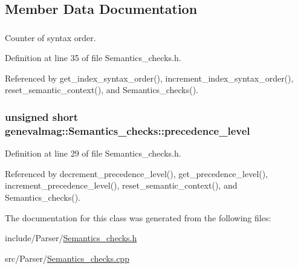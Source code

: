\subsection{Member Data Documentation}
\hypertarget{classgenevalmag_1_1Semantics__checks_7dcdb23df315da76ae288462e3427591}{
\subsubsection[{index\_\-syntax\_\-order}]{}}
\label{classgenevalmag_1_1Semantics__checks_7dcdb23df315da76ae288462e3427591}


Counter of syntax order. 



Definition at line 35 of file Semantics\_\-checks.h.

Referenced by get\_\-index\_\-syntax\_\-order(), increment\_\-index\_\-syntax\_\-order(), reset\_\-semantic\_\-context(), and Semantics\_\-checks().\hypertarget{classgenevalmag_1_1Semantics__checks_e69cd5c1a7b7d2cfa05c370617a8d58f}{
\subsubsection[{precedence\_\-level}]{\setlength{\rightskip}{0pt plus 5cm}unsigned short {\bf genevalmag::Semantics\_\-checks::precedence\_\-level}}}
\label{classgenevalmag_1_1Semantics__checks_e69cd5c1a7b7d2cfa05c370617a8d58f}




Definition at line 29 of file Semantics\_\-checks.h.

Referenced by decrement\_\-precedence\_\-level(), get\_\-precedence\_\-level(), increment\_\-precedence\_\-level(), reset\_\-semantic\_\-context(), and Semantics\_\-checks().

The documentation for this class was generated from the following files:\begin{CompactItemize}
\item 
include/Parser/\hyperlink{Semantics__checks_8h}{Semantics\_\-checks.h}\item 
src/Parser/\hyperlink{Semantics__checks_8cpp}{Semantics\_\-checks.cpp}\end{CompactItemize}
